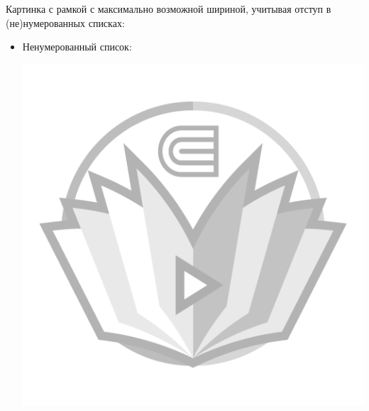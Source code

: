 Картинка с рамкой с максимально возможной шириной, учитывая отступ в (не)нумерованных списках:
\begin{itemize}
  \item Ненумерованный список:
        \begin{center}
          \begin{minipage}[c]{\textwidth-\fboxaddlen}
            \centering
            \includegraphics[width={\textwidth - \fboxaddlen},fbox]{Images/watermark.png}
          \end{minipage}
        \end{center}

\end{itemize}

